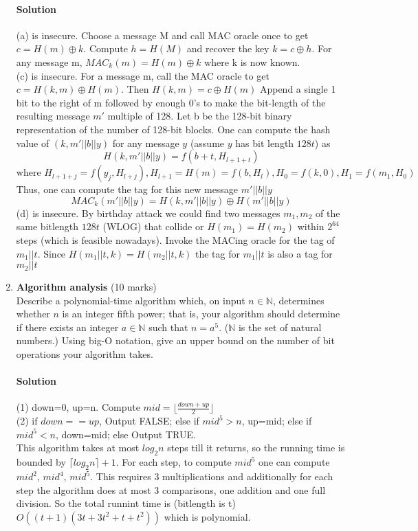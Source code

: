 \documentclass[11pt]{article}
\newcommand{\NN}{{\mathbb N}}
\newcommand{\floor}[1]{\lfloor #1 \rfloor}
\begin{document}
\begin{enumerate}
\paragraph{Solution}
(a) is insecure. Choose a message M and call MAC oracle once to get $c=H(m)\oplus k$. Compute $h=H(M)$ and recover the key $k=c\oplus h$. For any message m, $MAC_k(m)=H(m)\oplus k$ where k is now known.\\
(c) is insecure. For a message m, call the MAC oracle to get $c=H(k,m)\oplus H(m)$. Then $H(k,m)=c\oplus H(m)$ Append a single 1 bit to the right of m followed by enough 0's to make the bit-length of the resulting message $m'$ multiple of 128. Let b be the 128-bit binary representation of the number of 128-bit blocks.
One can compute the hash value of $(k,m'||b||y)$ for any message $y$ (assume $y$ has bit length $128t$) as
\[
H(k,m'||b||y)=f(b+t,H_{l+1+t})\] \[ \text{where }H_{l+1+j}=f(y_j,H_{l+j}),
H_{l+1}=H(m)=f(b,H_l), H_0=f(k,0), H_1=f(m_1,H_0)
\]
Thus, one can compute the tag for this new message $m'||b||y$
\[
MAC_k(m'||b||y)=H(k,m'||b||y)\oplus H(m'||b||y)
\]
(d) is insecure. By birthday attack we could find two messages $m_1,m_2$ of the same bitlength $128t$ (WLOG) that collide or $H(m_1)=H(m_2)$ within $2^{64}$ steps (which is feasible nowadays). Invoke the MACing oracle for the tag of $m_1||t$. Since $H(m_1||t,k)=H(m_2||t,k)$ the tag for $m_1||t$ is also a tag for $m_2||t$

\newpage
\item {\bf Algorithm analysis} (10 marks) \\
Describe a polynomial-time algorithm which, on input $n \in \NN$,
determines whether $n$ is an integer fifth power; that is, your algorithm
should determine if there exists an integer $a \in \NN$ such that $n
= a^5$.  ($\NN$ is the set of natural numbers.) Using big-O notation,
give an upper bound on the number of bit operations your algorithm takes.
\paragraph{Solution}
(1) down=0, up=n. Compute $mid=\floor{\frac{down+up}{2}}$\\
(2) if $down == up$, Output FALSE;
    else if $mid^5 > n$, up=mid;
    else if $mid^5 < n$, down=mid;
    else Output TRUE.
    \\
This algorithm takes at most $log_2n$ steps till it returns, so the running time is bounded by $\lceil log_2n \rceil+1$. For each step, to compute $mid^5$ one can compute $mid^2$, $mid^4$, $mid^5$. This requires 3 multiplications and additionally for each step the algorithm does at most 3 comparisons, one addition and one full division. So the total runnint time is (bitlength is t) $O((t+1)(3t+3t^2+t+t^2))$ which is polynomial.



\end{enumerate}
\end{document}
